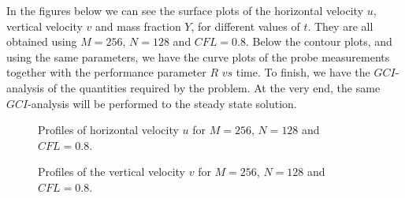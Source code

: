 In the figures below we can see the surface plots of the horizontal velocity $u$, vertical velocity $v$ and mass fraction $Y$, for different values of $t$. They are all obtained using $M=256$, $N=128$ and $CFL=0.8$. Below the contour plots, and using the same parameters, we have the curve plots of the probe measurements together with the performance parameter $R$ $vs$ time. To finish, we have the $GCI$-analysis of the quantities required by the problem. At the very end, the same $GCI$-analysis will be performed to the steady state solution.

\begin{figure}[H]
\centering     %
\hspace*{\fill}
\hfill
{}
\hspace*{\fill}

\hspace*{\fill}
\hfill
{}
\hspace*{\fill}

\hspace*{\fill}
\hfill
{}
\hspace*{\fill}
\caption{Profiles of horizontal velocity $u$ for $M=256$, $N=128$ and $CFL=0.8$.}
\end{figure}

\begin{figure}[H]
\centering     %
\hspace*{\fill}
\hfill
{}
\hspace*{\fill}

\hspace*{\fill}
\hfill
{}
\hspace*{\fill}

\hspace*{\fill}
\hfill
{}
\hspace*{\fill}
\caption{Profiles of the vertical velocity $v$ for $M=256$, $N=128$ and $CFL=0.8$.}
\end{figure}

